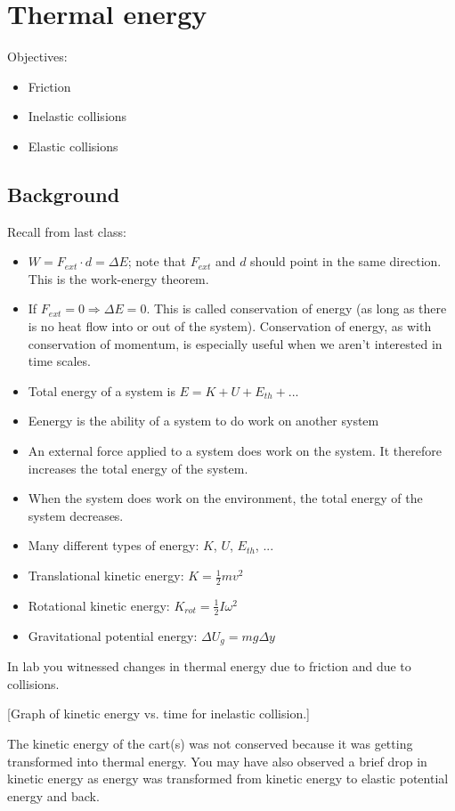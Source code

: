 \section{Thermal energy}
Objectives:
\begin{itemize}
\item Friction
\item Inelastic collisions
\item Elastic collisions
\end{itemize}

\subsection{Background}
Recall from last class:
\begin{itemize}
\item $W=F_{ext}\cdot d=\Delta{E}$; note that $F_{ext}$ and $d$ should point in the same direction. This is the work-energy theorem.
\item If $F_{ext}=0\Rightarrow \Delta{E}=0$. This is called conservation of energy (as long as there is no heat flow into or out of the system). Conservation of energy, as with conservation of momentum, is especially useful when we aren't interested in time scales.
\item Total energy of a system is $E=K+U+E_{th}+...$
\item Eenergy is the ability of a system to do work on another system
\item An external force applied to a system does work on the system. It therefore increases the total energy of the system.
\item When the system does work on the environment, the total energy of the system decreases.
\item Many different types of energy: $K$, $U$, $E_{th}$, $...$
\item Translational kinetic energy: $K=\frac{1}{2}mv^2$
\item Rotational kinetic energy: $K_{rot} = \frac{1}{2}I\omega^2$
\item Gravitational potential energy: $\Delta U_g=mg\Delta y$
\end{itemize}

In lab you witnessed changes in thermal energy due to friction and due to collisions.

[Graph of kinetic energy vs. time for inelastic collision.]
\vspace{4cm}

The kinetic energy of the cart(s) was not conserved because it was getting transformed into thermal energy. You may have also observed a brief drop in kinetic energy as energy was transformed from kinetic energy to elastic potential energy and back.


